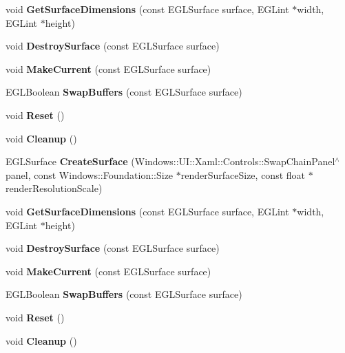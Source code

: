 \begin{DoxyCompactItemize}
\item 
\mbox{\label{classOpenGLES_a33027e4ee48c7524a11d0ba072f0428a}} 
void {\bfseries Get\+Surface\+Dimensions} (const E\+G\+L\+Surface surface, E\+G\+Lint $\ast$width, E\+G\+Lint $\ast$height)
\item 
\mbox{\label{classOpenGLES_a282b02e045d4db1bccb1e97c6301eda9}} 
void {\bfseries Destroy\+Surface} (const E\+G\+L\+Surface surface)
\item 
\mbox{\label{classOpenGLES_ac16d83572dee3dca15f84b987d238825}} 
void {\bfseries Make\+Current} (const E\+G\+L\+Surface surface)
\item 
\mbox{\label{classOpenGLES_a521858d67ba9334e3d09adea544d02c8}} 
E\+G\+L\+Boolean {\bfseries Swap\+Buffers} (const E\+G\+L\+Surface surface)
\item 
\mbox{\label{classOpenGLES_abb6bd80a4e3ca4a799768ee00326ba91}} 
void {\bfseries Reset} ()
\item 
\mbox{\label{classOpenGLES_adec02660f51d61862eabb9e53dfbff4f}} 
void {\bfseries Cleanup} ()
\item 
\mbox{\label{classOpenGLES_ac81a084bf9209c55ac354f1579b561dc}} 
E\+G\+L\+Surface {\bfseries Create\+Surface} (Windows\+::\+U\+I\+::\+Xaml\+::\+Controls\+::\+Swap\+Chain\+Panel$^\wedge$ panel, const Windows\+::\+Foundation\+::\+Size $\ast$render\+Surface\+Size, const float $\ast$render\+Resolution\+Scale)
\item 
\mbox{\label{classOpenGLES_a33027e4ee48c7524a11d0ba072f0428a}} 
void {\bfseries Get\+Surface\+Dimensions} (const E\+G\+L\+Surface surface, E\+G\+Lint $\ast$width, E\+G\+Lint $\ast$height)
\item 
\mbox{\label{classOpenGLES_a282b02e045d4db1bccb1e97c6301eda9}} 
void {\bfseries Destroy\+Surface} (const E\+G\+L\+Surface surface)
\item 
\mbox{\label{classOpenGLES_ac16d83572dee3dca15f84b987d238825}} 
void {\bfseries Make\+Current} (const E\+G\+L\+Surface surface)
\item 
\mbox{\label{classOpenGLES_a521858d67ba9334e3d09adea544d02c8}} 
E\+G\+L\+Boolean {\bfseries Swap\+Buffers} (const E\+G\+L\+Surface surface)
\item 
\mbox{\label{classOpenGLES_abb6bd80a4e3ca4a799768ee00326ba91}} 
void {\bfseries Reset} ()
\item 
\mbox{\label{classOpenGLES_adec02660f51d61862eabb9e53dfbff4f}} 
void {\bfseries Cleanup} ()
\end{DoxyCompactItemize}


